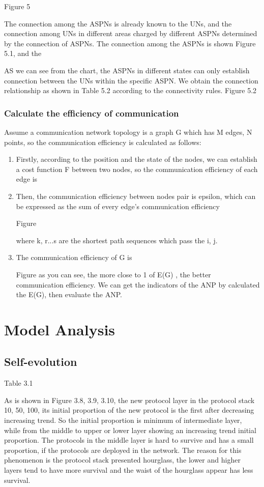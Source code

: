 \documentclass{article}
\begin{document}
Figure 5

The connection among the ASPNs is already known to the UNs, and the connection among UNs in different areas charged by different
ASPNs determined by the connection of ASPNs. The connection among the ASPNs is shown Figure 5.1, and the

AS we can see from the chart, the ASPNs in different states can only establish connection between the UNs within the specific ASPN.
We obtain the connection relationship as shown in Table 5.2 according to the connectivity rules.
Figure 5.2

\subsubsection{Calculate the efficiency of communication}
Assume a communication network topology is a graph G which has M edges, N points, so the communication efficiency is calculated as follows:
\begin{enumerate}
    \item Firstly,  according to the position and the state of the nodes, we can establish a cost function F between two nodes,
    so the communication efficiency of each edge is
    \item Then, the communication efficiency between nodes pair is epsilon, which can be expressed as the sum of every edge's
    communication efficiency

    Figure

    where k, r...s are the shortest path sequences which pass the i, j.
    \item The communication efficiency of G is

    Figure
    as you can see, the more close to 1 of E(G) , the better communication efficiency. We can get the indicators of the ANP by calculated the E(G), then evaluate the ANP.

\end{enumerate}
\section{Model Analysis}
\subsection{Self-evolution}
Table 3.1

As is shown in Figure 3.8, 3.9, 3.10, the new protocol layer in the protocol stack 10, 50, 100, its initial proportion of the new
protocol is the first after decreasing increasing trend. So the initial proportion is minimum of intermediate layer, while from
the middle to upper or lower layer showing an increasing trend initial proportion. The protocols in the middle layer is hard to
survive and has a small proportion, if the protocols are deployed in the network. The reason for this phenomenon is the
protocol stack presented hourglass, the lower and higher layers tend to have more survival and the waist of the hourglass appear has less survival.
\end{document}
